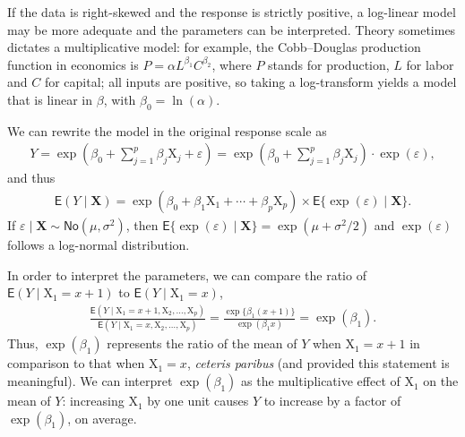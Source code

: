 \documentclass[
  11pt,
  letterpaper,
]{book}
\theoremstyle{definition}
\theoremstyle{definition}
\theoremstyle{definition}
\theoremstyle{remark}
\begin{document}
If the data is right-skewed and the response is strictly positive, a log-linear model may be more adequate and the parameters can be interpreted.
Theory sometimes dictates a multiplicative model: for example, the Cobb--Douglas production function in economics is
\(P=\alpha L^{\beta_1}C^{\beta_2}\), where \(P\) stands for production, \(L\) for labor and \(C\) for capital; all inputs are positive, so taking a log-transform yields a model that is linear in \(\beta\), with \(\beta_0=\ln(\alpha)\).

We can rewrite the model in the original response scale as
\begin{align*}
Y = \exp\left(\beta_0+\sum_{j=1}^p\beta_j\mathrm{X}_j +  \varepsilon \right) = \exp\left(\beta_0+ \sum_{j=1}^p\beta_j\mathrm{X}_j\right)\cdot \exp(\varepsilon),
\end{align*}
and thus
\begin{align*}
\mathsf{E}(Y \mid \mathbf{X}) = \exp(\beta_0 +\beta_1 \mathrm{X}_1 +\cdots + \beta_p\mathrm{X}_p ) \times \mathsf{E}\{\exp(\varepsilon) \mid \mathbf{X}\}.
\end{align*}
If \(\varepsilon \mid \mathbf{X} \sim \mathsf{No}(\mu,\sigma^2)\), then \(\mathsf{E}\{\exp(\varepsilon) \mid \mathbf{X}\}= \exp(\mu+\sigma^2/2)\) and \(\exp(\varepsilon)\) follows a log-normal distribution.

In order to interpret the parameters, we can compare the ratio of \(\mathsf{E}(Y \mid \mathrm{X}_1=x+1)\) to \(\mathsf{E}(Y \mid \mathrm{X}_1=x)\),
\begin{align*}
\frac{\mathsf{E}(Y \mid \mathrm{X}_1=x+1, \mathrm{X}_2, \ldots, \mathrm{X}_p)}{\mathsf{E}(Y \mid \mathrm{X}_1=x,  \mathrm{X}_2, \ldots, \mathrm{X}_p)} = \frac{\exp\{\beta_1(x+1)\}}{\exp(\beta_1 x)} = \exp(\beta_1).
\end{align*}
Thus, \(\exp(\beta_1)\) represents the ratio of the mean of \(Y\) when \(\mathrm{X}_1=x+1\) in comparison to that when \(\mathrm{X}_1=x\), \emph{ceteris paribus} (and provided this statement is meaningful). We can interpret \(\exp(\beta_1)\) as the multiplicative effect of \(\mathrm{X}_1\) on the mean of \(Y\): increasing \(\mathrm{X}_1\) by one unit causes \(Y\) to increase by a factor of \(\exp(\beta_1)\), on average.
\end{document}
